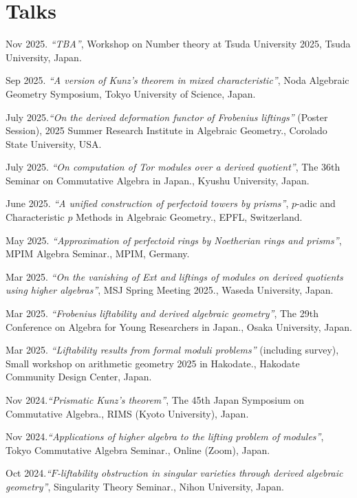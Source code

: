 \documentclass[10pt,a4paper,sans]{moderncv}
\begin{document}
\section{Talks}

\begin{etaremune}
  \item Nov 2025. \emph{``TBA''}, \textsf{Workshop on Number theory at Tsuda University 2025}, Tsuda University, Japan.
  \item Sep 2025. \emph{``A version of Kunz's theorem in mixed characteristic''}, \textsf{Noda Algebraic Geometry Symposium}, Tokyo University of Science, Japan.
  \item July 2025.\emph{``On the derived deformation functor of Frobenius liftings''} (Poster Session), \textsf{2025 Summer Research Institute in Algebraic Geometry.}, Corolado State University, USA.
  \item July 2025. \emph{``On computation of Tor modules over a derived quotient''}, \textsf{The 36th Seminar on Commutative Algebra in Japan.}, Kyushu University, Japan.
  \item June 2025. \emph{``A unified construction of perfectoid towers by prisms''}, \textsf{$p$-adic and Characteristic \(p\) Methods in Algebraic Geometry.}, EPFL, Switzerland.
  \item May 2025. \emph{``Approximation of perfectoid rings by Noetherian rings and prisms''}, \textsf{MPIM Algebra Seminar.}, MPIM, Germany.
  \item Mar 2025. \emph{``On the vanishing of Ext and liftings of modules on derived quotients using higher algebras''}, \textsf{MSJ Spring Meeting 2025.}, Waseda University, Japan.
  \item Mar 2025. \emph{``Frobenius liftability and derived algebraic geometry''}, \textsf{The 29th Conference on Algebra for Young Researchers in Japan.}, Osaka University, Japan.
  \item Mar 2025. \emph{``Liftability results from formal moduli problems''} (including survey), \textsf{Small workshop on arithmetic geometry 2025 in Hakodate.}, Hakodate Community Design Center, Japan.
  \item Nov 2024.\emph{``Prismatic Kunz's theorem''}, \textsf{The 45th Japan Symposium on Commutative Algebra.}, RIMS (Kyoto University), Japan.
  \item Nov 2024.\emph{``Applications of higher algebra to the lifting problem of modules''}, \textsf{Tokyo Commutative Algebra Seminar.}, Online (Zoom), Japan.
  \item Oct 2024.\emph{``\(F\)-liftability obstruction in singular varieties through derived algebraic geometry''}, \textsf{Singularity Theory Seminar.}, Nihon University, Japan.

\end{etaremune}
\end{document}
